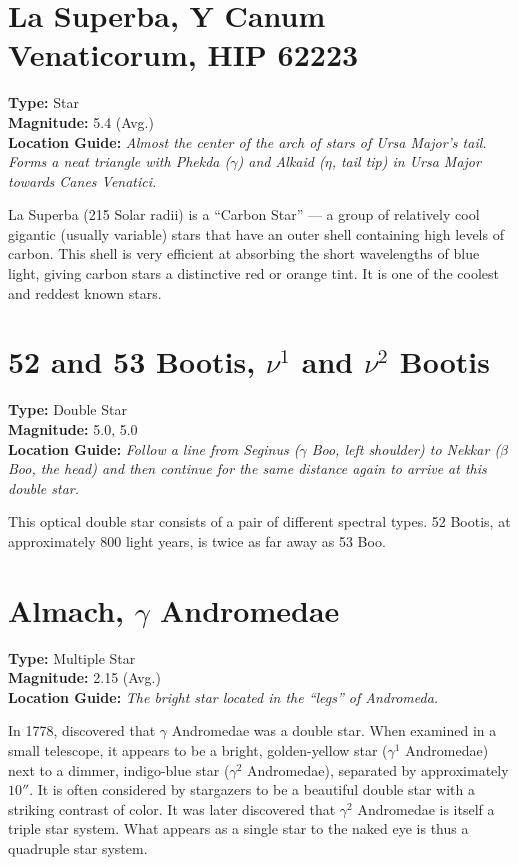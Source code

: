 \section{La Superba, Y Canum Venaticorum, HIP 62223}
\textbf{Type:} Star \\
\textbf{Magnitude:} 5.4 (Avg.) \\
\textbf{Location Guide:} \textit{Almost the center of the arch of stars of Ursa Major's tail.
  Forms a neat triangle with Phekda ($\gamma$) and Alkaid ($\eta$, tail tip) in Ursa Major towards Canes Venatici.} 

La Superba (215 Solar radii) is a ``Carbon Star'' --- a group of relatively cool gigantic (usually variable) stars that have an outer shell containing high levels of carbon.
This shell is very efficient at absorbing the short wavelengths of blue light, giving carbon stars a distinctive red or orange tint.
It is one of the coolest and reddest known stars.

\section{52 and 53 Bootis, \texorpdfstring{$\nu^1$ and $\nu^2$}{nu1 and nu2} Bootis} 
\textbf{Type:} Double Star \\
\textbf{Magnitude:} 5.0, 5.0 \\
\textbf{Location Guide:} \textit{Follow a line from Seginus ($\gamma$ Boo, left shoulder)
  to Nekkar ($\beta$ Boo, the head) and then continue for the same distance again to arrive at this double star.} 

This optical double star consists of a pair of different spectral types. 52 Bootis, at approximately 800 light years, is twice as far away as 53 Boo.

\section{Almach, \texorpdfstring{$\gamma$}{\gamma} Andromedae} 
\textbf{Type:} Multiple Star \\
\textbf{Magnitude:} 2.15 (Avg.) \\
\textbf{Location Guide:} \textit{The bright star located in the ``legs'' of Andromeda.} 

In 1778,  discovered that $\gamma$ Andromedae was a double star.
When examined in a small telescope, it appears to be a bright, golden-yellow star ($\gamma^1$ Andromedae)
next to a dimmer, indigo-blue star ($\gamma^2$ Andromedae), separated by approximately $10''$.
It is often considered by stargazers to be a beautiful double star with a striking contrast of color.
It was later discovered that $\gamma^2$ Andromedae is itself a triple star system.
What appears as a single star to the naked eye is thus a quadruple star system.

